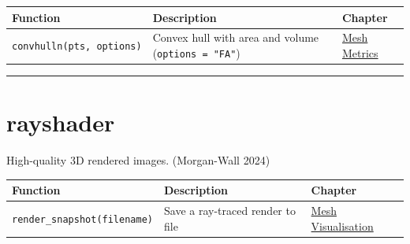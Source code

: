\documentclass[
  11pt,
  letterpaper,
  DIV=11,
  numbers=noendperiod]{scrreprt}
\begin{document}
\begin{longtable}[]{@{}
  >{\raggedright\arraybackslash}p{}
  >{\raggedright\arraybackslash}p{}
  >{\raggedright\arraybackslash}p{}@{}}
\toprule\noalign{}
\begin{minipage}[b]{\linewidth}\raggedright
Function
\end{minipage} & \begin{minipage}[b]{\linewidth}\raggedright
Description
\end{minipage} & \begin{minipage}[b]{\linewidth}\raggedright
Chapter
\end{minipage} \\
\midrule\noalign{}
\endhead
\bottomrule\noalign{}
\endlastfoot
\texttt{convhulln(pts,\ options)} & Convex hull with area and volume
(\texttt{options\ =\ "FA"}) & \hyperref[mesh-metrics]{Mesh Metrics} \\
\end{longtable}

\begin{center}\rule{0.5\linewidth}{0.5pt}\end{center}

\section{rayshader}\label{rayshader}

High-quality 3D rendered images. (Morgan-Wall 2024)

\begin{longtable}[]{@{}
  >{\raggedright\arraybackslash}p{}
  >{\raggedright\arraybackslash}p{}
  >{\raggedright\arraybackslash}p{}@{}}
\toprule\noalign{}
\begin{minipage}[b]{\linewidth}\raggedright
Function
\end{minipage} & \begin{minipage}[b]{\linewidth}\raggedright
Description
\end{minipage} & \begin{minipage}[b]{\linewidth}\raggedright
Chapter
\end{minipage} \\
\midrule\noalign{}
\endhead
\bottomrule\noalign{}
\endlastfoot
\texttt{render\_snapshot(filename)} & Save a ray-traced render to file &
\hyperref[d-visualisation]{Mesh Visualisation} \\
\end{longtable}
\end{document}
